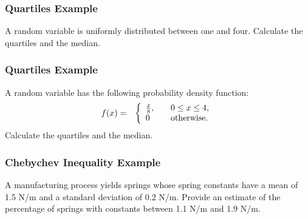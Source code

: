 \begin{frame}
  \frametitle{Quartiles Example}

  A random variable is uniformly distributed between one and
  four. Calculate the quartiles and the median.
  
\end{frame}

\begin{frame}
  \frametitle{Quartiles Example}

  A random variable has the following probability density function:
      \begin{eqnarray*}
      f(x) & = & \left\{
        \begin{array}{l@{\hspace{2em}}l}
          \frac{x}{8}, & 0\leq x \leq 4, \\
          0 & \mathrm{otherwise.}
        \end{array}
      \right.
    \end{eqnarray*}
  Calculate the quartiles and the median.
  
\end{frame}


\begin{frame}
  \frametitle{Chebychev Inequality Example}

  A manufacturing process yields springs whose spring constants have a
  mean of 1.5 N/m and a standard deviation of 0.2 N/m. Provide an
  estimate of the percentage of springs with constants between 1.1 N/m
  and 1.9 N/m.
  
\end{frame}



